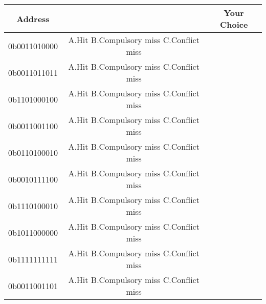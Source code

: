 \documentclass{article}
\begin{document}
\begin{table}[h!]
\centering
\renewcommand{\arraystretch}{1.3}
\setlength{\tabcolsep}{3mm}
\begin{tabular}{|c|c|c|}
\hline
Address &    & Your Choice\\\hline
0b0011010000 & A.Hit \hspace{3mm} B.Compulsory miss \hspace{3mm} C.Conflict miss & \\ \hline
0b0011011011 & A.Hit \hspace{3mm} B.Compulsory miss \hspace{3mm} C.Conflict miss & \\ \hline
0b1101000100 & A.Hit \hspace{3mm} B.Compulsory miss \hspace{3mm} C.Conflict miss & \\ \hline
0b0011001100 & A.Hit \hspace{3mm} B.Compulsory miss \hspace{3mm} C.Conflict miss & \\ \hline
0b0110100010 & A.Hit \hspace{3mm} B.Compulsory miss \hspace{3mm} C.Conflict miss & \\ \hline
0b0010111100 & A.Hit \hspace{3mm} B.Compulsory miss \hspace{3mm} C.Conflict miss & \\ \hline
0b1110100010 & A.Hit \hspace{3mm} B.Compulsory miss \hspace{3mm} C.Conflict miss & \\ \hline
0b1011000000 & A.Hit \hspace{3mm} B.Compulsory miss \hspace{3mm} C.Conflict miss & \\ \hline
0b1111111111 & A.Hit \hspace{3mm} B.Compulsory miss \hspace{3mm} C.Conflict miss & \\ \hline
0b0011001101 & A.Hit \hspace{3mm} B.Compulsory miss \hspace{3mm} C.Conflict miss & \\ \hline


\end{tabular}
\end{table}
\end{document}
